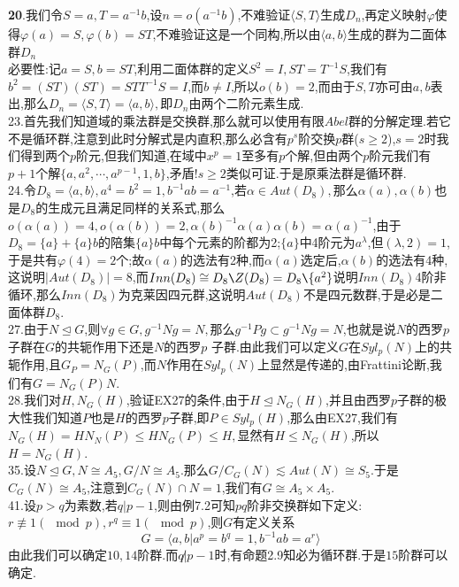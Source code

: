 \documentclass[b5paper]{ctexart}
\begin{document}
\pagestyle{plain}
\noindent
{}
\textbf{20}.我们令$S=a,T=a^{-1}b$,设$n=o(a^{-1}b)$,不难验证$\langle S,T\rangle$生成$D_n$,再定义映射$\varphi$使得$\varphi(a)=S,\varphi(b)=ST$,不难验证这是一个同构,所以由$\langle a,b\rangle$生成的群为二面体群$D_n$\\
必要性:记$a=S,b=ST$,利用二面体群的定义$S^2=I,ST=T^{-1}S$,我们有$b^2=(ST)(ST)=STT^{-1}S=I$,而$b\neq I$,所以$o(b)=2$,而由于$S,T$亦可由$a,b$表出,那么$D_n=\langle S,T\rangle=\langle a,b\rangle,$即$D_n$由两个二阶元素生成.\\
23.首先我们知道域的乘法群是交换群,那么就可以使用有限$Abel$群的分解定理.若它不是循环群,注意到此时分解式是内直积,那么必含有$p^s$阶交换$p$群($s\geq 2$),$s=2$时我们得到两个$p$阶元,但我们知道,在域中$x^p=1$至多有$p$个解,但由两个$p$阶元我们有$p+1$个解$\{a,a^2,\cdots,a^{p-1},1,b\}$,矛盾!$s\geq2$类似可证.于是原乘法群是循环群.\\
24.令$D_8=\langle a,b\rangle,a^4=b^2=1,b^{-1}ab=a^{-1}$,若$\alpha\in Aut(D_8),$那么$\alpha(a),\alpha(b)$也是$D_8$的生成元且满足同样的关系式,那么$o(\alpha(a))=4,o(\alpha(b))=2,\alpha(b)^{-1}\alpha(a)\alpha(b)=\alpha(a)^{-1}$,由于$D_8=\{a\}+\{a\}b$的陪集$\{a\}b$中每个元素的阶都为2;$\{a\}$中4阶元为$a^{\lambda}$,但$(\lambda,2)=1$,于是共有$\varphi(4)=2$个;故$\alpha(a)$的选法有2种,而$\alpha(a)$选定后,$\alpha(b)$的选法有4种,这说明$|Aut(D_8)|=8$,而$Inn(D_8)\cong D_8\texttt{\char92}Z(D_8)=D_8\texttt{\char92}\{a^2\}$说明$Inn(D_8)$4阶非循环,那么$Inn(D_8)$为克莱因四元群,这说明$Aut(D_8)$不是四元数群,于是必是二面体群$D_8$.\\
27.由于$N\unlhd G$,则$\forall g\in G,g^{-1}Ng=N,$那么$g^{-1}Pg\subset g^{-1}Ng=N$,也就是说$N$的西罗$p$子群在$G$的共轭作用下还是$N$的西罗$p$
子群.由此我们可以定义$G$在$Syl_p(N)$上的共轭作用,且$G_{P}=N_{G}(P)$,而$N$作用在$Syl_p(N)$上显然是传递的,由Frattini论断,我们有$G=N_{G}(P)N$.\\
28.我们对$H,N_G(H)$,验证EX27的条件,由于$H\unlhd N_G(H)$,并且由西罗$p$子群的极大性我们知道$P$也是$H$的西罗$p$子群,即$P\in Syl_p(H)$,那么由EX27,我们有$N_G(H)=HN_N(P)\leq HN_G(P)\leq H,$显然有$H\leq N_G(H)$,所以$H=N_G(H)$.\\
35.设$N\unlhd G,N\cong A_5,G/N\cong A_5.$那么$G/C_G(N)\lesssim Aut(N)\cong S_5.$于是$C_G(N)\cong A_5$,注意到$C_G(N)\cap N=1$,我们有$G\cong A_5\times A_5$.\\
41.设$p>q$为素数,若$q|p-1$,则由例7.2可知$pq$阶非交换群如下定义:$r\not\equiv 1(\mod p),r^q\equiv 1(\mod p)$,则$G$有定义关系
\[G=\langle a,b|a^p=b^q=1,b^{-1}ab=a^r\rangle\]
由此我们可以确定$10,14$阶群.而$q\not|p-1$时,有命题2.9知必为循环群.于是$15$阶群可以确定.
\end{document}
